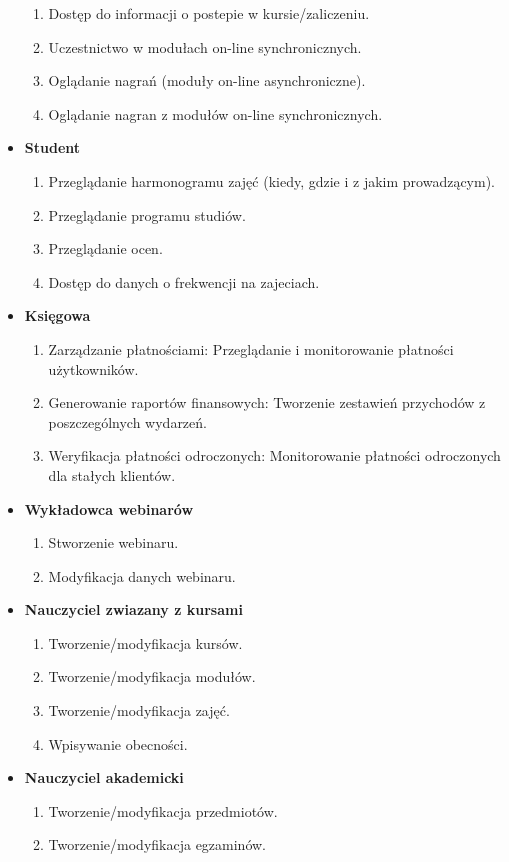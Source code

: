 \documentclass[11pt]{article}
\begin{document}
\begin{itemize}
\begin{enumerate}
\item Dostęp do informacji o postepie w kursie/zaliczeniu.
\item Uczestnictwo w modułach on-line synchronicznych.
\item Oglądanie nagrań (moduły on-line asynchroniczne).
\item Oglądanie nagran z modułów on-line synchronicznych.
\end{enumerate}
\item \textbf{Student}
\begin{enumerate}
\item Przeglądanie harmonogramu zajęć (kiedy, gdzie i z jakim prowadzącym).
\item Przeglądanie programu studiów.
\item Przeglądanie ocen.
\item Dostęp do danych o frekwencji na zajeciach.
\end{enumerate}
\item \textbf{Księgowa}
\begin{enumerate}
\item Zarządzanie płatnościami: Przeglądanie i monitorowanie płatności użytkowników.
\item Generowanie raportów finansowych: Tworzenie zestawień przychodów z poszczególnych wydarzeń.
\item Weryfikacja płatności odroczonych: Monitorowanie płatności odroczonych dla stałych klientów.
\end{enumerate}
\item \textbf{Wykładowca webinarów}
\begin{enumerate}
\item Stworzenie webinaru.
\item Modyfikacja danych webinaru.
\end{enumerate}
\item \textbf{Nauczyciel zwiazany z kursami}
\begin{enumerate}
\item Tworzenie/modyfikacja kursów.
\item Tworzenie/modyfikacja modułów.
\item Tworzenie/modyfikacja zajęć.
\item Wpisywanie obecności.
\end{enumerate}
\item \textbf{Nauczyciel akademicki}
\begin{enumerate}
\item Tworzenie/modyfikacja przedmiotów.
\item Tworzenie/modyfikacja egzaminów.

\end{enumerate}
\end{itemize}
\end{document}
